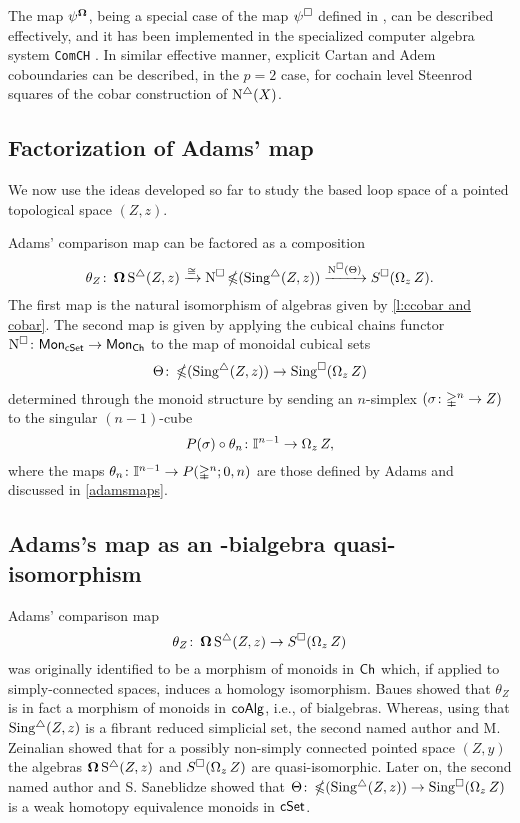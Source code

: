 The map $\psi^{\operatorname{\mathbf{\Omega}}}$, being a special case of the map $\psi^\square$ defined in \cite{medina2020maysteenrod}, can be described effectively, and it has been implemented in the specialized computer algebra system \texttt{ComCH} \cite{medina2021computer}.
In similar effective manner, explicit Cartan and Adem coboundaries \cite{medina2020cartan, medina2020adem} can be described, in the $p = 2$ case, for cochain level Steenrod squares of the cobar construction of $\operatorname{N^{\triangle}}(X)$.

\subsection{Factorization of Adams' map} \label{ss:factorization of adams}

We now use the ideas developed so far to study the based loop space of a pointed topological space $(Z, z)$.

Adams' comparison map can be factored as a composition
\begin{equation} \label{e:factorization of adams}
\theta_Z \colon \operatorname{\mathbf{\Omega}} \operatorname{S^{\triangle}}(Z, z) \xrightarrow{\cong}
\operatorname{N^{\square}} \operatorname{\mathbb{\Omega}}(\operatorname{Sing^{\triangle}}(Z, z)) \xrightarrow{\operatorname{N^{\square}}(\Theta)}
S^{\square}(\operatorname{\Omega}_z Z).
\end{equation}
The first map is the natural isomorphism of algebras given by \cref{l:ccobar and cobar}. The second map is given by applying the cubical chains functor $\operatorname{N^{\square}} \colon \mathsf{Mon}_{\mathsf{cSet}} \to \mathsf{Mon}_{\mathsf{Ch}}$ to the map of monoidal cubical sets
\[
\Theta \colon \operatorname{\mathbb{\Omega}}(\operatorname{Sing^{\triangle}}(Z, z)) \to \operatorname{Sing^{\square}}(\operatorname{\Omega}_z Z)
\]
determined through the monoid structure by sending an $n$-simplex $(\sigma \colon \mathbb{\Delta}^n \to Z)$ to the singular $(n-1)$-cube
\[
P(\sigma) \circ \theta_n \colon \mathbb{I}^{n-1} \to \operatorname{\Omega}_z Z,
\]
where the maps $\theta_n \colon \mathbb{I}^{n-1} \to P(\mathbb{\Delta}^n;0,n)$ are those defined by Adams and discussed in \cref{adamsmaps}.

\subsection{Adams's map as an \pdfEinfty-bialgebra quasi-isomorphism}

Adams' comparison map
\[
\theta_Z \colon \operatorname{\mathbf{\Omega}} \operatorname{S^{\triangle}}(Z, z) \to S^{\square}(\operatorname{\Omega}_z Z)
\]
was originally identified to be a morphism of monoids in $\mathsf{Ch}$ which, if applied to simply-connected spaces, induces a homology isomorphism.
Baues showed that $\theta_Z$ is in fact a morphism of monoids in $\mathsf{coAlg}$, i.e., of bialgebras.
Whereas, using that $\operatorname{Sing^{\triangle}}(Z, z)$ is a fibrant reduced simplicial set, the second named author and M. Zeinalian \cite{rivera2018cubical} showed that for a possibly non-simply connected pointed space $(Z,y)$ the algebras $\operatorname{\mathbf{\Omega}} \operatorname{S^{\triangle}}(Z, z)$ and $S^{\square}(\operatorname{\Omega}_zZ)$ are quasi-isomorphic.
Later on, the second named author and S. Saneblidze
\cite{rivera2019path} showed that $\Theta \colon \operatorname{\mathbb{\Omega}}(\operatorname{Sing^{\triangle}}(Z, z)) \to \operatorname{Sing^{\square}}(\operatorname{\Omega}_z Z)$ is a weak homotopy equivalence monoids in $\mathsf{cSet}$.

